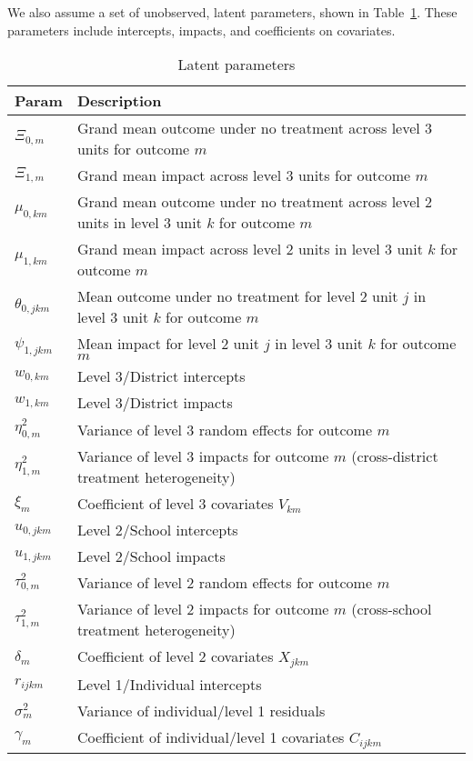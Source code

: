 \documentclass[12pt]{article}
\begin{document}
We also assume a set of unobserved, latent parameters, shown in Table~\ref{tab:latent_param}.
These parameters include intercepts, impacts, and coefficients on covariates.

\begin{table}[h]
\begin{tabular}{p{1.5cm} | p{16cm}}
Param											& Description \\ \hline
$\Xi_{0,m}$ 									& Grand mean outcome under no treatment across level 3 units for outcome $m$\\
$\Xi_{1,m}$										& Grand mean impact across level 3 units for outcome $m$\\
$\mu_{0,km}$									& Grand mean outcome under no treatment across level 2 units in level 3 unit $k$ for outcome $m$\\
$\mu_{1,km}$									& Grand mean impact across level 2 units in level 3 unit $k$ for outcome $m$\\
$\theta_{0,jkm}$								& Mean outcome under no treatment for level 2 unit $j$ in level 3 unit $k$ for outcome $m$\\
$\psi_{1,jkm}$									& Mean impact for level 2 unit $j$ in level 3 unit $k$ for outcome $m$\\ \hline
$w_{0,km}$										& Level 3/District intercepts\\
$w_{1,km}$										& Level 3/District impacts \\
$\eta^2_{0,m}$									& Variance of level 3 random effects for outcome $m$ \\
$\eta^2_{1,m}$									& Variance of level 3 impacts for outcome $m$ (cross-district treatment heterogeneity) \\
$\xi_m$											& Coefficient of level 3 covariates $V_{km}$ \\ \hline
$u_{0,jkm}$										& Level 2/School intercepts\\
$u_{1,jkm}$										& Level 2/School impacts \\
$\tau^2_{0,m}$									& Variance of level 2 random effects for outcome $m$ \\
$\tau^2_{1,m}$									& Variance of level 2 impacts for outcome $m$ (cross-school treatment heterogeneity) \\
$\delta_{m}$									& Coefficient of level 2 covariates $X_{jkm}$ \\\hline
$r_{ijkm}$										& Level 1/Individual intercepts \\
$\sigma^2_{m}$									& Variance of individual/level 1 residuals \\
$\gamma_{m}$									& Coefficient of individual/level 1 covariates $C_{ijkm}$ \\
\end{tabular}
\caption{Latent parameters\label{tab:latent_param}}
\end{table}
\end{document}
